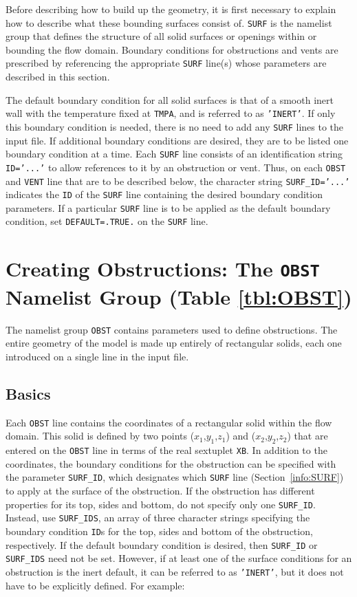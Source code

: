 \documentclass[11pt]{book}
\newcommand{\ct}{\tt\small}
\begin{document}
Before describing how to build up the geometry, it is first necessary to explain how to describe what these bounding surfaces
consist of. {\ct SURF} is the namelist group that defines
the structure of all solid surfaces or openings within or
bounding the flow domain. Boundary conditions for obstructions and vents are
prescribed by referencing the appropriate {\ct SURF} line(s) whose
parameters are described in this section.

The default boundary condition for all solid surfaces is that of a smooth
inert wall with the temperature fixed at {\ct TMPA}, and is referred to as {\ct 'INERT'}. If only this
boundary condition is needed, there is no need to add any {\ct SURF} lines
to the input file. If additional boundary conditions are desired,
they are to be listed one boundary condition at a time.
Each {\ct SURF} line consists of an identification string {\ct ID='...'} to
allow references to it by an obstruction or vent. Thus, on each
{\ct OBST} and {\ct VENT} line that are to be described below, the character string {\ct SURF\_ID='...'}
indicates the {\ct ID} of the {\ct SURF} line containing the desired boundary
condition parameters. If a particular {\ct SURF} line is to be applied
as the default boundary condition,
set {\ct DEFAULT=.TRUE.} on the {\ct SURF} line.




\section{Creating Obstructions: The \texorpdfstring{{\tt OBST}}{OBST} Namelist Group (Table \ref{tbl:OBST})}
\label{info:OBST}

The namelist group {\ct OBST} contains parameters used to define obstructions. The entire geometry of the model is made up entirely
of rectangular solids, each one introduced on a single line in the input file.

\subsection{Basics}
\label{info:OBST_Basics}

Each {\ct OBST} line contains the coordinates of a rectangular
solid within the flow domain. This solid is defined by two points
($x_1$,$y_1$,$z_1$) and ($x_2$,$y_2$,$z_2$) that are entered on the
{\ct OBST} line in terms of the real sextuplet {\ct XB}.
In addition to the coordinates, the boundary conditions for the obstruction
can be specified with the parameter {\ct SURF\_ID}, which designates which
{\ct SURF} line (Section~\ref{info:SURF}) to apply at the surface of the obstruction.
If the obstruction has different properties for its top,
sides and bottom, do not specify only one {\ct SURF\_ID}. Instead, use {\ct SURF\_IDS}, an array of three character
strings specifying the boundary condition {\ct ID}s for the top,
sides and bottom of the obstruction, respectively.
If the default
boundary condition is desired, then {\ct SURF\_ID} or {\ct SURF\_IDS} need not be set.
However, if at least one of the surface conditions for an
obstruction is the inert default, it can be referred to as {\ct 'INERT'}, but it does not have to be explicitly defined.
For example:
\end{document}
